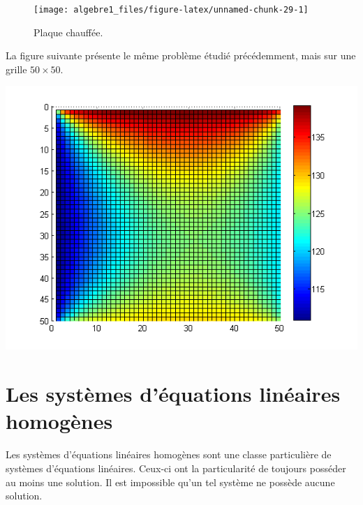 \documentclass[]{book}
\theoremstyle{definition}
\theoremstyle{definition}
\theoremstyle{definition}
\theoremstyle{remark}
\begin{document}
\begin{figure}

{\centering \texttt{[image: algebre1\_files/figure-latex/unnamed-chunk-29-1]} 

}

\caption{Plaque chauffée.}\label{fig:unnamed-chunk-29}
\end{figure}

La figure suivante présente le même problème étudié précédemment, mais sur une grille \(50\times 50\).

\begin{center}\includegraphics[width=0.75\linewidth]{resources/images/grille_chaleur} \end{center}

\hypertarget{les-systuxe8mes-duxe9quations-linuxe9aires-homoguxe8nes}{%
\section{Les systèmes d'équations linéaires homogènes}\label{les-systuxe8mes-duxe9quations-linuxe9aires-homoguxe8nes}}

Les systèmes d'équations linéaires homogènes sont une classe particulière de systèmes d'équations linéaires. Ceux-ci ont la particularité de toujours posséder au moins une solution. Il est impossible qu'un tel système ne possède aucune solution.
\end{document}
